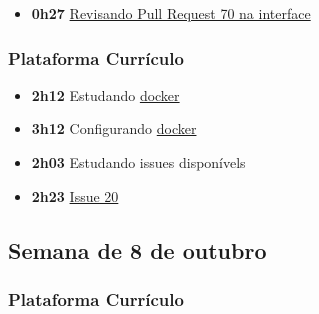\begin{itemize}
\tightlist
\item
  \textbf{0h27}
  \href{https://github.com/prefeiturasp/SME-plataforma-curriculo-interface/pull/70}{Revisando
  Pull Request 70 na interface}
\end{itemize}

\hypertarget{plataforma-curruxedculo-1}{%
\subsubsection{Plataforma Currículo}\label{plataforma-curruxedculo-1}}

\begin{itemize}
\tightlist
\item
  \textbf{2h12} Estudando \href{https://www.docker.com/}{docker}
\item
  \textbf{3h12} Configurando \href{https://www.docker.com/}{docker}
\item
  \textbf{2h03} Estudando issues disponívels
\item
  \textbf{2h23}
  \href{https://github.com/prefeiturasp/SME-plataforma-curriculo/issues/20}{Issue
  20}
\end{itemize}

\hypertarget{semana-de-8-de-outubro}{%
\subsection{Semana de 8 de outubro}\label{semana-de-8-de-outubro}}

\hypertarget{plataforma-curruxedculo-2}{%
\subsubsection{Plataforma Currículo}\label{plataforma-curruxedculo-2}}

